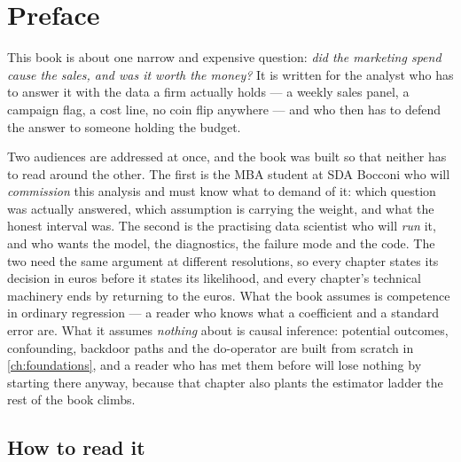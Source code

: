 %
\chapter*{Preface}

This book is about one narrow and expensive question: \emph{did the marketing spend cause the
sales, and was it worth the money?} It is written for the analyst who has to answer it with the
data a firm actually holds --- a weekly sales panel, a campaign flag, a cost line, no coin flip
anywhere --- and who then has to defend the answer to someone holding the budget.

Two audiences are addressed at once, and the book was built so that neither has to read around
the other. The first is the MBA student at SDA Bocconi who will \emph{commission} this analysis
and must know what to demand of it: which question was actually answered, which assumption is
carrying the weight, and what the honest interval was. The second is the practising data
scientist who will \emph{run} it, and who wants the model, the diagnostics, the failure mode and
the code. The two need the same argument at different resolutions, so every chapter states its
decision in euros before it states its likelihood, and every chapter's technical machinery ends
by returning to the euros. What the book assumes is competence in ordinary regression --- a
reader who knows what a coefficient and a standard error are. What it assumes \emph{nothing}
about is causal inference: potential outcomes, confounding, backdoor paths and the do-operator
are built from scratch in \cref{ch:foundations}, and a reader who has met them before will lose
nothing by starting there anyway, because that chapter also plants the estimator ladder the rest
of the book climbs.

\section*{How to read it}

